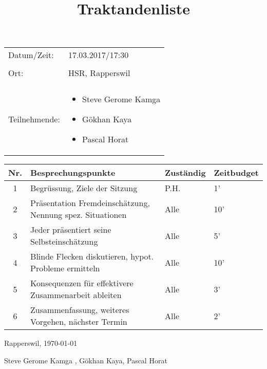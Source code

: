 \documentclass[10pt]{article}
\title{Traktandenliste}
\date{}             %
\begin{document}
\maketitle




\begin{tabular}{l p{5cm}}


Datum/Zeit: & 17.03.2017/17:30 \\ \\

Ort: & HSR, Rapperswil \\ \\
Teilnehmende: & \begin{itemize} \item Steve Gerome Kamga\item Gökhan Kaya \item Pascal Horat \end{itemize}

\end{tabular}

\vspace{1cm}

\begin{tabular}{|c|l|l|l|}
\hline
\textbf{Nr.} &\textbf{Besprechungspunkte} & \textbf{Zuständig} & \textbf{Zeitbudget} \\ \hline
1 & Begrüssung, Ziele der Sitzung & P.H. & 1' \\ \hline
2 & Präsentation Fremdeinschätzung, Nennung spez. Situationen & Alle & 10' \\ \hline
3 & Jeder präsentiert seine Selbsteinschätzung & Alle & 5' \\ \hline
4 & Blinde Flecken diskutieren, hypot. Probleme ermitteln  & Alle & 10' \\ \hline
5 & Konsequenzen für effektivere Zusammenarbeit ableiten & Alle & 3' \\ \hline
6 & Zusammenfassung, weiteres Vorgehen, nächster Termin & Alle & 2' \\ \hline

\end{tabular}

\vspace{1cm}

Rapperswil, \today

\vspace{1cm}

Steve Gerome Kamga , Gökhan Kaya, Pascal Horat
\end{document}
